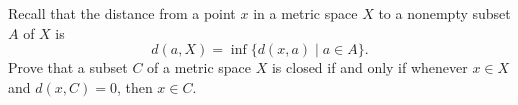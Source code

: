 \begin{comment}
We proved in class that if $F$ is a closed set such that $A \subseteq F$, then $\overline{A} \subseteq F$. So the only item left to prove is that $\overline{A}$ is the intersection of all such closed sets $F$ and hence is closed. We proved in class that $\overline{A}$ is closed, so we only need to demonstrate that $\overline{A}$ is the intersection of all closed sets that contain $A$. 

Let $\Gamma$ be the collection of closed subsets of $X$ that contain $A$, and let $B = \bigcap_{F \in \Gamma} F$. Since every set in $\Gamma$ contains $A$, then $A \subseteq B$. Now we verify the reverse containment. Suppose $b \in B$. Proceed by contradiction. Assume $b \notin \overline{A}$. Then $b$ is not in $A$ and $b$ is not a limit point of $A$. So there exists an $\epsilon > 0$ so that $B(b,\epsilon) \cap A = \emptyset$. Let $F = X \setminus B(b,\epsilon)$. We know that $B(b, \epsilon)$ is an open set, so $F$ is closed. Since $B(b,\epsilon) \cap A = \emptyset$, we have $A \subset F$. Therefore, $F$ is a closed set containing $A$. Hence, $b \in F$. But $b \notin F = X \setminus B(b,\epsilon)$, which is a contradiction. Therefore, we conclude that $b \in \overline{A}$ and $B \subset \overline{A}$. Having verified the two containments, we can say that $\overline{A} = \bigcap_{F \in \Gamma} F$. 

\ea

\end{comment}

\item Recall that the distance from a point $x$ in a metric space $X$ to a nonempty subset $A$ of $X$ is 
\[d(a,X) = \inf\{d(x,a) \mid a \in A\}.\]
Prove that a subset $C$ of a metric space $X$ is closed if and only if whenever $x \in X$ and $d(x,C) = 0$, then $x \in C$. 

\begin{comment}

\ExerciseSolution Let $C$ be a subset of a metric space $X$. First assume that $C$ is closed. We will show that whenever $x \in X$ and $d(x,C) = 0$, then $x \in C$. So let $x \in X$ such that $d(x,C) = 0$. We know that there exists a sequence $(c_n)$ in $C$ such that $0 = d(x,C) = \lim d(x,c_n)$. If $x = c_n$ for some $n$, then $x \in C$ and we are done. Otherwise, given any open ball $B$ around $x$, there is a positive integer $n$ so that $c_n \in B$. Thus, every neighborhood of $x$ contains a point in $C$ different from $x$. This makes $x$ a limit point of $C$. The fact that $C$ is closed implies $x \in C$. 

Now assume that whenever $x \in X$ and $d(x,C) = 0$, then $x \in C$. We will prove that $C$ is closed by demonstrating that $C$ contains all of its limit points. Let $x$ be a limit point of $C$. So every neighborhood of $x$ contains a point in $C$ different from $x$. Thus, there is a point $c_n \in C$ such that $c_n \in B\left(x, \frac{1}{n}\right)$ for any positive integer $n$. It follows that $d(x,c_n) < \frac{1}{n}$ and so $\lim d(x,c_n) = 0$. Thus, $d(x,C) = 0$ and so $x \in C$. We conclude that $C$ contains all of its limit points and it therefore a closed set.

\end{comment}


